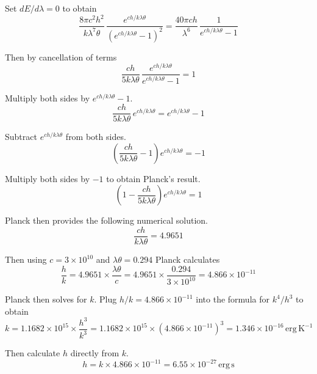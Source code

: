\documentclass[12pt]{article}
\begin{document}
\noindent
Set $dE/d\lambda=0$ to obtain
\begin{equation*}
\frac{8\pi c^2h^2}{k\lambda^7\theta}\,\frac{e^{ch/k\lambda\theta}}{(e^{ch/k\lambda\theta}-1)^2}
=\frac{40\pi ch}{\lambda^6}\,\frac{1}{e^{ch/k\lambda\theta}-1}
\end{equation*}

\noindent
Then by cancellation of terms
\begin{equation*}
\frac{ch}{5k\lambda\theta}\,\frac{e^{ch/k\lambda\theta}}{e^{ch/k\lambda\theta}-1}=1
\end{equation*}

\noindent
Multiply both sides by $e^{ch/k\lambda\theta}-1$.
\begin{equation*}
\frac{ch}{5k\lambda\theta}\, e^{ch/k\lambda\theta}
=e^{ch/k\lambda\theta}-1
\end{equation*}

\noindent
Subtract $e^{ch/k\lambda\theta}$ from both sides.
\begin{equation*}
\left(\frac{ch}{5k\lambda\theta}-1\right)e^{ch/k\lambda\theta}=-1
\end{equation*}

\noindent
Multiply both sides by $-1$ to obtain Planck's result.
\begin{equation*}
\left(1-\frac{ch}{5k\lambda\theta}\right)e^{ch/k\lambda\theta}=1
\end{equation*}

\noindent
Planck then provides the following numerical solution.
\begin{equation*}
\frac{ch}{k\lambda\theta}=4.9651
\end{equation*}

\noindent
Then using $c=3\times10^{10}$ and $\lambda\theta=0.294$ Planck calculates
\begin{equation*}
\frac{h}{k}=4.9651\times\frac{\lambda\theta}{c}=4.9651\times\frac{0.294}{3\times10^{10}}=4.866\times10^{-11}
\end{equation*}

\noindent
Planck then solves for $k$.
Plug $h/k=4.866\times10^{-11}$ into the formula for $k^4/h^3$ to obtain
\begin{equation*}
k=1.1682\times10^{15}\times\frac{h^3}{k^3}
=1.1682\times10^{15}\times(4.866\times10^{-11})^3=1.346\times10^{-16}\,\text{erg}\,\text{K}^{-1}
\end{equation*}

\noindent
Then calculate $h$ directly from $k$.
\begin{equation*}
h=k\times4.866\times10^{-11}=6.55\times10^{-27}\,\text{erg}\,\text{s}
\end{equation*}
\end{document}
